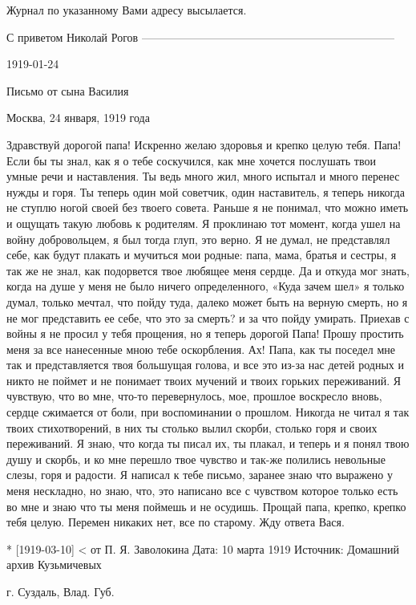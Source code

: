 Журнал по указанному Вами адресу высылается.

С приветом
Николай Рогов
--------------------------------------------------------------------

1919-01-24

Письмо от сына Василия 

Москва, 24 января, 1919 года

Здравствуй дорогой папа!
Искренно желаю здоровья и крепко целую тебя.
Папа! Если бы ты знал, как я о тебе соскучился, как мне хочется послушать твои умные речи и наставления. 
Ты ведь много жил, много испытал и много перенес нужды и горя. 
Ты теперь один мой советчик, один наставитель, я теперь никогда не ступлю ногой своей без твоего совета.
Раньше я не понимал, что можно иметь и ощущать такую любовь к родителям.
Я проклинаю тот момент, когда ушел на войну добровольцем, я был тогда глуп, это верно.
Я не думал, не представлял себе, как будут плакать и мучиться мои родные:  папа, мама, братья и сестры, я так же не знал, как подорвется твое любящее меня сердце.
Да и откуда мог знать, когда на душе у меня не было ничего определенного, «Куда зачем шел» я только думал, только мечтал, что пойду туда, далеко может быть на верную смерть, но я не мог представить ее себе, что это за смерть? и за что пойду умирать. Приехав с войны я не просил у тебя прощения, но я теперь дорогой Папа! Прошу простить меня за все нанесенные мною тебе оскорбления. 
Ах! Папа, как ты поседел мне так и представляется твоя большущая голова, и все это из-за нас детей родных и никто не поймет и не понимает твоих мучений и твоих горьких переживаний.
Я чувствую, что во мне, что-то перевернулось, мое, прошлое воскресло вновь, сердце сжимается от боли, при воспоминании о прошлом. Никогда не читал я так твоих стихотворений, в них ты столько вылил скорби, столько горя и своих переживаний.
Я знаю, что когда ты писал их, ты плакал, и теперь и я понял твою душу и скорбь, и ко мне перешло твое чувство и так-же полились невольные слезы, горя и радости. 
Я написал к тебе письмо, заранее знаю что выражено у меня нескладно, но знаю, что, это написано все с чувством которое только есть во мне  и знаю что ты меня поймешь и не осудишь. Прощай папа, крепко, крепко тебя целую.
Перемен никаких нет, все по старому.
Жду ответа Вася.





* [1919-03-10] < от П. Я. Заволокина 
Дата: 10 марта 1919
Источник: Домашний архив Кузьмичевых

г. Суздаль, Влад. Губ.

